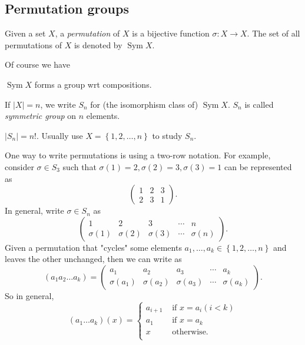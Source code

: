 \documentclass[10pt]{article}
\DeclareMathOperator{\sym}{Sym}
\begin{document}
    \subsection{Permutation groups}
    \begin{definition}
        Given a set $X$, a \textit{permutation} of $X$ is a bijective function $ \sigma:X\to X $. The set of all permutations of $X$ is denoted by $ \sym X $.
    \end{definition}
    Of course we have 
    \begin{theorem}\label{thm:perm_group}
        $ \sym X $ forms a group wrt compositions.
    \end{theorem}
    \begin{definition}
        If $ |X|=n $, we write $ S_n $ for (the isomorphism class of) $ \sym X $. $S_n$ is called \textit{symmetric group} on $n$ elements.
    \end{definition}
    \begin{remark}
        $ |S_n|=n! $. Usually use $ X=\left\{ 1,2,\dots,n\right\} $ to study $S_n$.
    \end{remark}
    One way to write permutations is using a two-row notation. For example, consider $ \sigma\in S_3 $ such that $ \sigma(1)=2, \sigma(2)=3, \sigma(3)=1 $ can be represented as
    \[
        \begin{pmatrix}
            1&2&3\\
            2&3&1
        \end{pmatrix}
    .\]
    In general, write $ \sigma\in S_n $ as 
    \[
        \begin{pmatrix}
            1&2&3&\cdots&n\\
            \sigma(1)&\sigma(2)&\sigma(3)&\cdots&\sigma(n)
        \end{pmatrix}
    .\]
    Given a permutation that "cycles" some elements $ a_1,\dots,a_k \in \left\{ 1,2,\dots,n\right\}$ and leaves the other unchanged, then we can write as
    \[
        (a_1 a_2 \dots a_k) = \begin{pmatrix}
            a_1&a_2&a_3&\cdots&a_k\\
            \sigma(a_1)&\sigma(a_2)&\sigma(a_3)&\cdots&\sigma(a_k)
        \end{pmatrix}
    .\]
    So in general,
    \[
        (a_1 \dots a_k)(x) =\begin{cases}
        a_{i+1} &\text{ if } x=a_i(i<k)\\
        a_1 &\text{ if } x=a_k\\
        x &\text{ otherwise.}\\
        \end{cases} 
    \]
\end{document}
